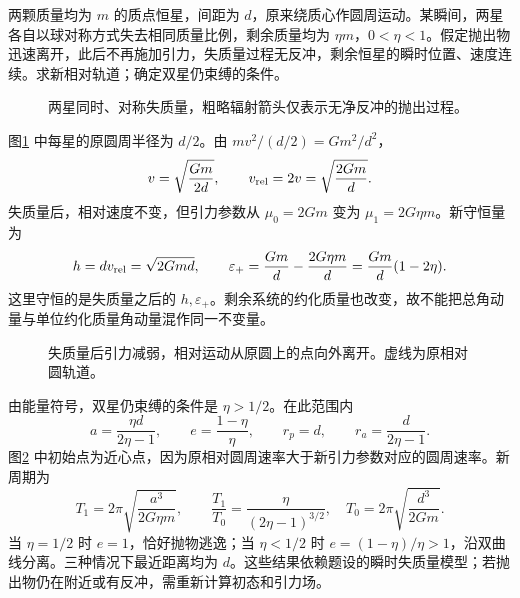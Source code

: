 \begin{exercise}[双星同时失去部分质量]\label{deep8:problem-exercise-4}\label{deep8:ex:d8-h4}
两颗质量均为 $m$ 的质点恒星，间距为 $d$，原来绕质心作圆周运动。某瞬间，两星各自以球对称方式失去相同质量比例，剩余质量均为 $\eta m$，$0<\eta<1$。假定抛出物迅速离开，此后不再施加引力，失质量过程无反冲，剩余恒星的瞬时位置、速度连续。求新相对轨道；确定双星仍束缚的条件。
\end{exercise}
\begin{figure}[H]\centering
{}
\caption{两星同时、对称失质量，粗略辐射箭头仅表示无净反冲的抛出过程。}\label{deep8:fig:d8-h4-q}
\end{figure}
\begin{solution}
图\ref{deep8:fig:d8-h4-q} 中每星的原圆周半径为 $d/2$。由 $mv^2/(d/2)=Gm^2/d^2$，
\[
 v=\sqrt{\frac{Gm}{2d}},\qquad v_{\rm rel}=2v=\sqrt{\frac{2Gm}d}.
\]
失质量后，相对速度不变，但引力参数从 $\mu_0=2Gm$ 变为 $\mu_1=2G\eta m$。新守恒量为
\[
 h=dv_{\rm rel}=\sqrt{2Gmd},\qquad
 \varepsilon_+=\frac{Gm}d-\frac{2G\eta m}d
 =\frac{Gm}d(1-2\eta).
\]
这里守恒的是失质量之后的 $h,\varepsilon_+$。剩余系统的约化质量也改变，故不能把总角动量与单位约化质量角动量混作同一不变量。
\begin{figure}[H]\centering
{}
\caption{失质量后引力减弱，相对运动从原圆上的点向外离开。虚线为原相对圆轨道。}\label{deep8:fig:d8-h4-s}
\end{figure}
由能量符号，双星仍束缚的条件是 $\eta>1/2$。在此范围内
\[
 a=\frac{\eta d}{2\eta-1},\qquad
 e=\frac{1-\eta}{\eta},\qquad
 r_p=d,\qquad r_a=\frac d{2\eta-1}.
\]
图\ref{deep8:fig:d8-h4-s} 中初始点为近心点，因为原相对圆周速率大于新引力参数对应的圆周速率。新周期为
\[
 T_1=2\pi\sqrt{\frac{a^3}{2G\eta m}},\qquad
 \frac{T_1}{T_0}=\frac{\eta}{(2\eta-1)^{3/2}},
 \quad T_0=2\pi\sqrt{\frac{d^3}{2Gm}}.
\]
当 $\eta=1/2$ 时 $e=1$，恰好抛物逃逸；当 $\eta<1/2$ 时 $e=(1-\eta)/\eta>1$，沿双曲线分离。三种情况下最近距离均为 $d$。这些结果依赖题设的瞬时失质量模型；若抛出物仍在附近或有反冲，需重新计算初态和引力场。
\end{solution}


